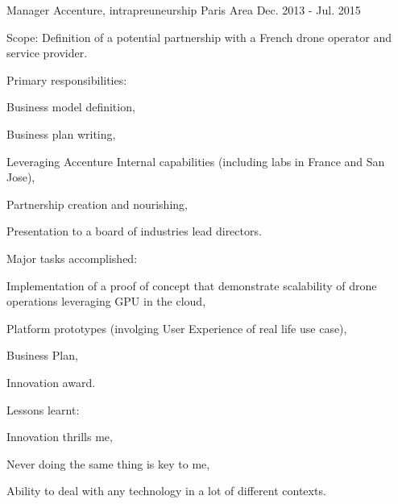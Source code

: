 \begin{cventries}
  \cventry
    {Manager} %
    {Accenture, intrapreuneurship} %
    {Paris Area} %
    {Dec. 2013 - Jul. 2015} %
    {
      \begin{cvitems} %
        \item {Scope: Definition of a potential partnership with a French drone operator and service provider.}
        \item {Primary responsibilities:}
        \begin{cvsubitems}
          \item {Business model definition,}
          \item {Business plan writing,}
          \item {Leveraging Accenture Internal capabilities (including labs in France and San Jose),}
          \item {Partnership creation and nourishing,}
          \item {Presentation to a board of industries lead directors.}
        \end{cvsubitems}
        \item {Major tasks accomplished:}
        \begin{cvsubitems}
          \item {Implementation of a proof of concept that demonstrate scalability of drone operations leveraging GPU in the cloud,}
          \item {Platform prototypes (involging User Experience of real life use case),}
          \item {Business Plan,}
          \item {Innovation award.}
        \end{cvsubitems}
        \item {Lessons learnt:}
        \begin{cvsubitems}
          \item {Innovation thrills me,}
          \item {Never doing the same thing is key to me,}
          \item {Ability to deal with any technology in a lot of different contexts.}
        \end{cvsubitems}
      \end{cvitems}
    }


\end{cventries}
